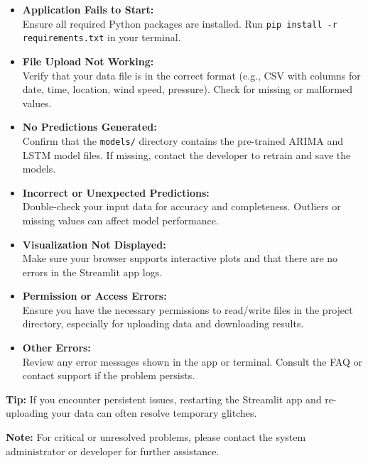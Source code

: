 \begin{itemize}
	\item \textbf{Application Fails to Start:} \\
	Ensure all required Python packages are installed. Run \texttt{pip install -r requirements.txt} in your terminal.
	
	\item \textbf{File Upload Not Working:} \\
	Verify that your data file is in the correct format (e.g., CSV with columns for date, time, location, wind speed, pressure). Check for missing or malformed values.
	
	\item \textbf{No Predictions Generated:} \\
	Confirm that the \texttt{models/} directory contains the pre-trained ARIMA and LSTM model files. If missing, contact the developer to retrain and save the models.
	
	\item \textbf{Incorrect or Unexpected Predictions:} \\
	Double-check your input data for accuracy and completeness. Outliers or missing values can affect model performance.
	
	\item \textbf{Visualization Not Displayed:} \\
	Make sure your browser supports interactive plots and that there are no errors in the Streamlit app logs.
	
	\item \textbf{Permission or Access Errors:} \\
	Ensure you have the necessary permissions to read/write files in the project directory, especially for uploading data and downloading results.
	
	\item \textbf{Other Errors:} \\
	Review any error messages shown in the app or terminal. Consult the FAQ or contact support if the problem persists.
\end{itemize}

\textbf{Tip:}  
If you encounter persistent issues, restarting the Streamlit app and re-uploading your data can often resolve temporary glitches.

\textbf{Note:}  
For critical or unresolved problems, please contact the system administrator or developer for further assistance.










